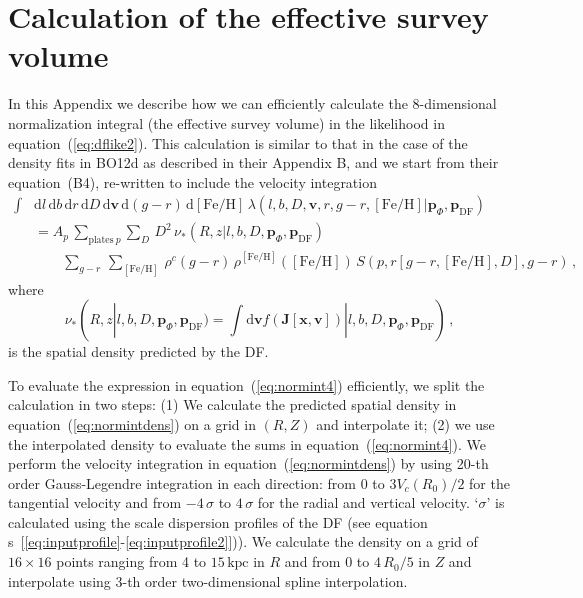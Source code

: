 \documentclass{emulateapj}
\newcommand{\dd}{\mathrm{d}}
\newcommand{\eqnname}{equation}
\newcommand{\equationname}{\eqnname}
\newcommand{\feh}{\ensuremath{[\mathrm{Fe/H}]}}
\newcommand{\dens}{\ensuremath{\nu_*}}
\renewcommand{\vec}[1]{\ensuremath{\mathbf{#1}}}
\newcommand{\vecx}{\ensuremath{\vec{x}}}
\newcommand{\vecv}{\ensuremath{\vec{v}}}
\newcommand{\vecj}{\ensuremath{\vec{J}}}
\newcommand{\df}{\ensuremath{f}}
\newcommand{\paramsdf}{\ensuremath{\vec{p}_{\mathrm{DF}}}}
\newcommand{\paramspot}{\ensuremath{\vec{p}_\Phi}}
\newcommand{\kpc}{\ensuremath{\,\mathrm{kpc}}}
\newcommand{\bo}{BO12}
\begin{document}
\section{Calculation of the effective survey volume}\label{sec:normint}

In this Appendix we describe how we can efficiently calculate the
8-dimensional normalization integral (the effective survey volume) in
the likelihood in \equationname~(\ref{eq:dflike2}). This calculation
is similar to that in the case of the density fits in \bo d as
described in their Appendix B, and we start from their
\equationname~(B4), re-written to include the velocity integration
\begin{equation}\label{eq:normint4}
\begin{split}
\int & \dd l\,\dd b\,\dd r\,\dd D\, \dd \vecv \,\dd (g-r) \,\dd \feh
\,\lambda(l,b,D,\vecv,r,g-r,\feh|\paramspot,\paramsdf) \\ &=
A_p\,\sum_{\mathrm{plates}\ p}
\sum_{D}\,D^2\,\dens(R,z|l,b,D,\paramspot,\paramsdf)\,\\ & \qquad \sum_{g-r}
\,\sum_{\feh}\,\rho^c(g-r)\,\rho^{\feh}(\feh)\,
S(p,r[g-r,\feh,D],g-r)\,,
\end{split}
\end{equation}
where
\begin{equation}\label{eq:normintdens}
\dens(R,z|l,b,D,\paramspot,\paramsdf) = \int \dd \vecv
\df(\vecj[\vecx,\vecv])|l,b,D,\paramspot,\paramsdf) \,,
\end{equation}
is the spatial density predicted by the DF.

To evaluate the expression in \equationname~(\ref{eq:normint4})
efficiently, we split the calculation in two steps: (1) We calculate
the predicted spatial density in \equationname~(\ref{eq:normintdens})
on a grid in $(R,Z)$ and interpolate it; (2) we use the interpolated
density to evaluate the sums in \equationname~(\ref{eq:normint4}). We
perform the velocity integration in
\equationname~(\ref{eq:normintdens}) by using 20-th order
Gauss-Legendre integration in each direction: from 0 to $3V_c(R_0)/2$
for the tangential velocity and from $-4\,\sigma$ to $4\,\sigma$ for
the radial and vertical velocity. `$\sigma$' is calculated using the
scale dispersion profiles of the DF (see \equationname
s~[\ref{eq:inputprofile}-\ref{eq:inputprofile2}])). We calculate the
density on a grid of $16\times16$ points ranging from 4 to $15\kpc$ in
$R$ and from $0$ to $4\,R_0/5$ in $Z$ and interpolate using 3-th order
two-dimensional spline interpolation.
\end{document}
